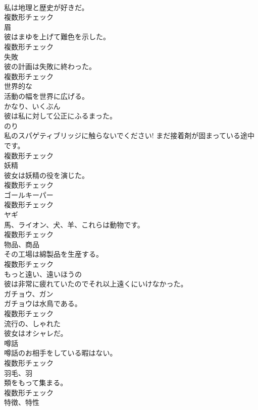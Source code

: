 \documentclass[8pt]{extreport}
\begin{document}
\begin{CJK}{UTF8}{min}
\\	私は地理と歴史が好きだ。	
\\	複数形チェック
\\	[名詞]	眉	
\\	彼はまゆを上げて難色を示した。	
\\	複数形チェック
\\	[名詞]	失敗	
\\	彼の計画は失敗に終わった。	
\\	複数形チェック
\\	[形容詞]	世界的な	
\\	活動の幅を世界に広げる。	
\\	[副詞]	かなり、いくぶん	
\\	彼は私に対して公正にふるまった。	
\\	[名詞]	のり	
\\	私のスパゲティブリッジに触らないでください! まだ接着剤が固まっている途中です。	
\\	複数形チェック
\\	[名詞]	妖精	
\\	彼女は妖精の役を演じた。	
\\	複数形チェック
\\	[名詞]	ゴールキーパー	
\\	複数形チェック
\\	[名詞]	ヤギ	
\\	馬、ライオン、犬、羊、これらは動物です。	
\\	複数形チェック
\\	[名詞]	物品、商品	
\\	その工場は綿製品を生産する。	
\\	複数形チェック
\\	[形容詞]	もっと遠い、遠いほうの	
\\	彼は非常に疲れていたのでそれ以上遠くにいけなかった。	
\\	[名詞]	ガチョウ、ガン	
\\	ガチョウは水鳥である。	
\\	複数形チェック
\\	[形容詞]	流行の、しゃれた	
\\	彼女はオシャレだ。	
\\	[名詞]	噂話	
\\	噂話のお相手をしている暇はない。	
\\	複数形チェック
\\	[名詞]	羽毛、羽	
\\	類をもって集まる。	
\\	複数形チェック
\\	[名詞]	特徴、特性	

\end{CJK}
\end{document}
